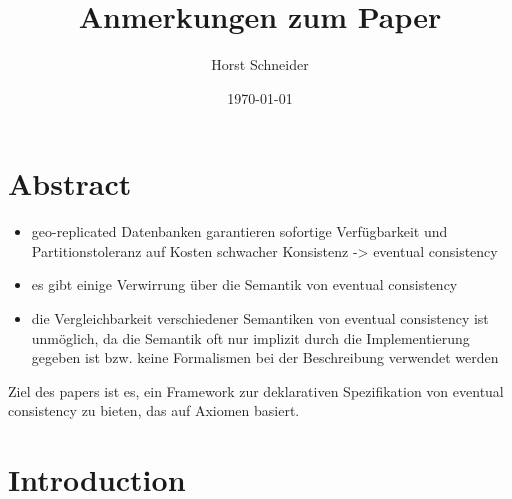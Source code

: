 \documentclass[11pt,a4paper,ngerman]{scrartcl}
\title{Anmerkungen zum Paper}
\author{Horst Schneider}
\date{\today{}}
\begin{document}
 
\maketitle 
\pagebreak
\tableofcontents
\section{Abstract}
\begin{itemize}
\item \Gls{geo-replicated} Datenbanken garantieren sofortige Verfügbarkeit und Partitionstoleranz auf Kosten schwacher Konsistenz -> \gls{eventual consistency}
\item es gibt einige Verwirrung über die Semantik von \gls{eventual consistency}
\item die Vergleichbarkeit verschiedener Semantiken von \gls{eventual consistency} ist unmöglich, da die Semantik oft nur implizit durch die Implementierung gegeben ist bzw. keine Formalismen bei der Beschreibung verwendet werden
\end{itemize}

\begin{framed}
Ziel des papers ist es, ein Framework zur deklarativen Spezifikation von \gls{eventual consistency} zu bieten, das auf Axiomen basiert.
\end{framed}

\section{Introduction}


\printglossaries
\end{document}
